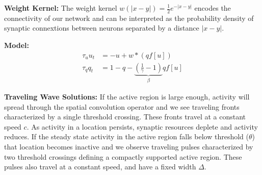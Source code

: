\documentclass[landscape,final]{baposter}
\begin{document}
\begin{poster}
{	\bigbreak
	\textbf{Weight Kernel:}	
	The weight kernel $w(|x - y|) = \tfrac{1}{2}e^{-|x - y|}$ encodes the connectivity of our network and can be interpreted as the probability density of synaptic connextions between neurons separated by a distance $|x - y|$.
	
	\textbf{Model:}
	\begin{align*}
		\tau_u u_t &= -u + w * (q f[u]) \\
		\tau_q q_t &= 1 - q - \underbrace{(\tfrac{1}{\gamma} - 1)}_{\beta} q f[u]
	\end{align*}
	
	\textbf{Traveling Wave Solutions:}
	If the active region is large enough, activity will spread through the spatial convolution operator and we see traveling fronts characterized by a single threshold crossing. These fronts travel at a constant speed $c$. As activity in a location persists, synaptic resources deplete and activity reduces. If the steady state activity in the active region falls below threshold ($\theta$) that location becomes inactive and we observe traveling pulses characterized by two threshold crossings defining a compactly supported active region. These pulses also travel at a constant speed, and have a fixed width $\Delta$.
	\bigbreak
	
}
\end{poster}
\end{document}
